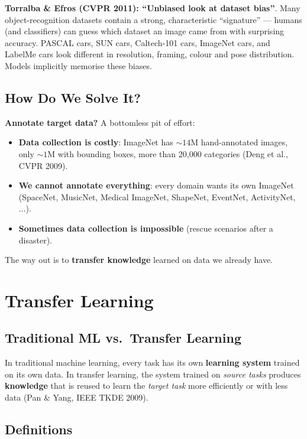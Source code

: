\documentclass[11pt,a4paper]{article}
\theoremstyle{definition}
\theoremstyle{plain}
\theoremstyle{remark}
\begin{document}
\textbf{Torralba \& Efros (CVPR 2011): ``Unbiased look at dataset bias''}. Many object-recognition datasets contain a strong, characteristic ``signature'' --- humans (and classifiers) can guess which dataset an image came from with surprising accuracy. PASCAL cars, SUN cars, Caltech-101 cars, ImageNet cars, and LabelMe cars look different in resolution, framing, colour and pose distribution. Models implicitly memorise these biases.

\subsection{How Do We Solve It?}

\textbf{Annotate target data?} A bottomless pit of effort:

\begin{itemize}
    \item \textbf{Data collection is costly}: ImageNet has $\sim 14$M hand-annotated images, only $\sim 1$M with bounding boxes, more than 20{,}000 categories (Deng et al., CVPR 2009).
    \item \textbf{We cannot annotate everything}: every domain wants its own ImageNet (SpaceNet, MusicNet, Medical ImageNet, ShapeNet, EventNet, ActivityNet, $\ldots$).
    \item \textbf{Sometimes data collection is impossible} (rescue scenarios after a disaster).
\end{itemize}

The way out is to \textbf{transfer knowledge} learned on data we already have.


\section{Transfer Learning}

\subsection{Traditional ML vs.\ Transfer Learning}

In traditional machine learning, every task has its own \textbf{learning system} trained on its own data. In transfer learning, the system trained on \emph{source tasks} produces \textbf{knowledge} that is reused to learn the \emph{target task} more efficiently or with less data (Pan \& Yang, IEEE TKDE 2009).

\subsection{Definitions}
\end{document}
